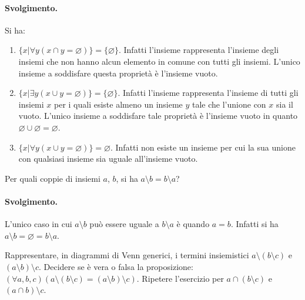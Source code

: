 \paragraph{Svolgimento.} Si ha:
\begin{enumerate}
	\item $\{x | \forall y (x \cap y = \varnothing)\}=\{ \varnothing \}$. Infatti l'insieme rappresenta l'insieme degli insiemi che non hanno alcun elemento in comune con tutti gli insiemi. L'unico insieme a soddisfare questa proprietà è l'insieme vuoto.
	\item $\{x | \exists y (x \cup y = \varnothing)\} = \{ \varnothing\}$. Infatti l'insieme rappresenta l'insieme di tutti gli insiemi $x$ per i quali esiste almeno un insieme $y$ tale che l'unione con $x$ sia il vuoto. L'unico insieme a soddisfare tale proprietà è l'insieme vuoto in quanto $\varnothing \cup \varnothing = \varnothing$.
	\item $\{x | \forall y (x \cup y = \varnothing)\}= \varnothing$. Infatti non esiste un insieme per cui la sua unione con qualsiasi insieme sia uguale all'insieme vuoto. \hfill \blacksquare
\end{enumerate}
\begin{exsbox}
	Per quali coppie di insiemi $a$, $b$, si ha $a \setminus b = b \setminus a$?
\end{exsbox}
\paragraph{Svolgimento.} L'unico caso in cui $a \setminus b$ può essere uguale a $b \setminus a$ è quando $a=b$. Infatti si ha $a \setminus b = \varnothing = b \setminus a$. \hfill \blacksquare
\begin{exsbox}
	Rappresentare, in diagrammi di Venn generici, i termini insiemistici $a \setminus ( b \setminus c)$ e $(a \setminus b) \setminus c$. Decidere se è vera o falsa la proposizione: $(\forall a,b,c)(a \setminus(b \setminus c) = (a \setminus b) \setminus c)$. Ripetere l'esercizio per $a \cap (b \setminus c)$ e $(a \cap b)\setminus c$.
\end{exsbox}
